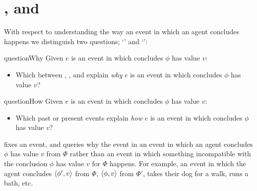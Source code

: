 \section*{\qWhy{}, \qHow{} and \issueInclusion{}}
\label{cha:intro:why-how}


\begin{note}
  With respect to understanding the way an event in which an agent concludes happens we distinguish two questions; `\qWhy{}' and `\qHow{}':

  \begin{question}{questionWhy}{\qWhy{}}
    Given \(e\) is an event in which \vAgent{} concludes \(\phi\) has value \(v\):
    \begin{itemize}
    \item
      Which \ros{} between , , and  explain \emph{why} \(e\) is an event in which \vAgent{} concludes \(\phi\) has value \(v\)?
    \end{itemize}
    \vspace{-1.5\baselineskip}
  \end{question}

  \begin{question}{questionHow}{\qHow{}}
    \label{q:how}
    Given \(e\) is an event in which \vAgent{} concludes \(\phi\) has value \(v\):
    \begin{itemize}
    \item
      Which past or present events explain \emph{how} \(e\) is an event in which \vAgent{} concludes \(\phi\) has value \(v\)?
    \end{itemize}
    \vspace{-1.5\baselineskip}
  \end{question}
\end{note}


\begin{note}
  \qWhy{} fixes an event, and queries why the event in an event in which an agent concludes \(\phi\) has value \(v\) from \(\Phi\) rather than an event in which something incompatible with the conclusion \(\phi\) has value \(v\) for \(\Phi\) happens.
  For example, an event in which the agent concludes \(\langle \phi', v \rangle\) from \(\Phi\), \(\langle \phi, v \rangle\) from \(\Phi'\), takes their dog for a walk, runs a bath, etc.
\end{note}


